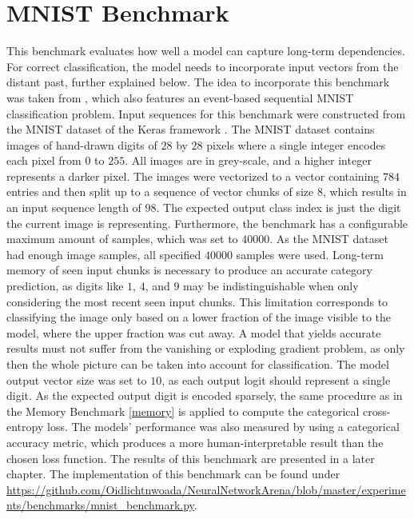 \documentclass[draft,final]{vutinfth} %
\begin{document}
    \section{MNIST Benchmark} \label{mnist}
    This benchmark evaluates how well a model can capture long-term dependencies. For correct classification, the model needs to incorporate input vectors from the distant past, further explained below.
    The idea to incorporate this benchmark was taken from \cite{ODELSTM}, which also features an event-based sequential MNIST classification problem.
    Input sequences for this benchmark were constructed from the MNIST dataset of the Keras framework \cite{Keras}.
    The MNIST dataset contains images of hand-drawn digits of $28$ by $28$ pixels where a single integer encodes each pixel from $0$ to $255$.
    All images are in grey-scale, and a higher integer represents a darker pixel.
    The images were vectorized to a vector containing $784$ entries and then split up to a sequence of vector chunks of size $8$, which results in an input sequence length of $98$.
    The expected output class index is just the digit the current image is representing.
    Furthermore, the benchmark has a configurable maximum amount of samples, which was set to $40000$.
    As the MNIST dataset had enough image samples, all specified $40000$ samples were used.
    Long-term memory of seen input chunks is necessary to produce an accurate category prediction, as digits like $1$, $4$, and $9$ may be indistinguishable when only considering the most recent seen input chunks.
    This limitation corresponds to classifying the image only based on a lower fraction of the image visible to the model, where the upper fraction was cut away.
    A model that yields accurate results must not suffer from the vanishing or exploding gradient problem, as only then the whole picture can be taken into account for classification.
    The model output vector size was set to $10$, as each output logit should represent a single digit.
    As the expected output digit is encoded sparsely, the same procedure as in the Memory Benchmark \ref{memory} is applied to compute the categorical cross-entropy loss.
    The models' performance was also measured by using a categorical accuracy metric, which produces a more human-interpretable result than the chosen loss function.
    The results of this benchmark are presented in a later chapter.
    The implementation of this benchmark can be found under \url{https://github.com/Oidlichtnwoada/NeuralNetworkArena/blob/master/experiments/benchmarks/mnist_benchmark.py}.
\end{document}
